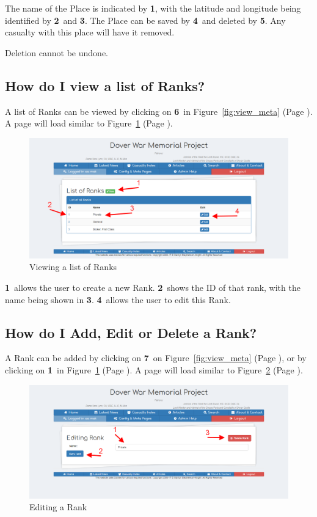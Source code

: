 \documentclass[12pt]{article}
\newcommand{\marker}[1]{\color{red}\textbf{#1}\color{black}}
\newcommand{\myref}[1]{\ref{#1} {\scriptsize(Page \pageref{#1})}}
\begin{document}
The name of the Place is indicated by \marker{1}, with the latitude and longitude being identified by \marker{2}\ and \marker{3}. The Place can be saved by \marker{4}\ and deleted by \marker{5}. Any casualty with this place will have it removed.

\begin{warningBox}
Deletion cannot be undone.
\end{warningBox} 

\newpage
\FloatBarrier
\subsection{How do I view a list of Ranks?}\label{ssec:view_rank}
A list of Ranks can be viewed by clicking on \marker{6}\ in Figure~\myref{fig:view_meta}. A page will load similar to Figure~\myref{fig:view_rank}.

\begin{figure}[h]
  \centering
 \includegraphics[width=.9\textwidth]{pics/view_rank.png}
	\caption{Viewing a list of Ranks}\label{fig:view_rank}
\end{figure}

\marker{1}\ allows the user to create a new Rank. \marker{2}\ shows the ID of that rank, with the name being shown in \marker{3}. \marker{4}\ allows the user to edit this Rank.

\newpage
\FloatBarrier
\subsection{How do I Add, Edit or Delete a Rank?}\label{ssec:edit_rank}
A Rank can be added by clicking on \marker{7}\ on Figure~\myref{fig:view_meta}, or by clicking on \marker{1}\ in Figure~\myref{fig:view_rank}. A page will load similar to Figure~\myref{fig:edit_rank}.

\begin{figure}[h]
  \centering
 \includegraphics[width=.9\textwidth]{pics/edit_rank.png}
	\caption{Editing a Rank}\label{fig:edit_rank}
\end{figure}
\end{document}
